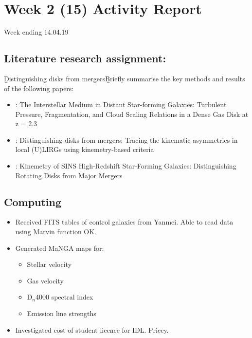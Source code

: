 \section{Week 2 (15) Activity Report}
Week ending 14.04.19
\subsection{Literature research assignment:}
\b{Distinguishing disks from mergers}\b
Briefly summarise the key methods and results of the following papers:
\begin{itemize}
    \item \citet{2011ApJ...742...11S} : {The Interstellar Medium in Distant Star-forming Galaxies: Turbulent Pressure, Fragmentation, and Cloud Scaling Relations in a Dense Gas Disk at z = 2.3}
    \item \citet{2016A&A...591A..85B} : {Distinguishing disks from mergers: Tracing the kinematic asymmetries in local (U)LIRGs using kinemetry-based criteria}
    \item \citet{2008ApJ...682..231S} : {Kinemetry of SINS High-Redshift Star-Forming Galaxies: Distinguishing Rotating Disks from Major Mergers}
\end{itemize}

\subsection{Computing}
\begin{itemize}
    \item {Received FITS tables of control galaxies from Yanmei. Able to read data using Marvin function OK.}
    \item Generated MaNGA maps for:
    \begin{itemize} 
        \item Stellar velocity
        \item Gas velocity
        \item D$_n$4000 spectral index
        \item Emission line strengths
    \end{itemize}
    \item Investigated cost of student licence for IDL. Pricey.
\end{itemize}

